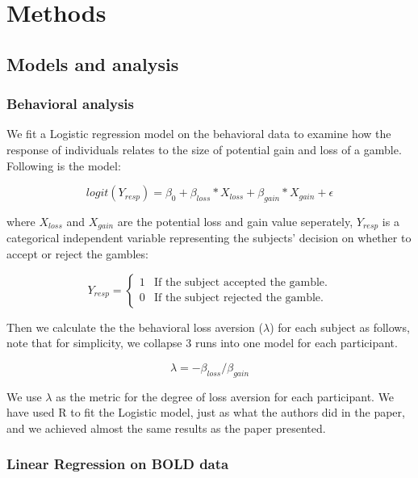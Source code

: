 \section{Methods}

\subsection{Models and analysis}

\subsubsection{Behavioral analysis}

We fit a Logistic regression model on the behavioral data to examine how the 
response of individuals relates to the size of potential gain and loss of a 
gamble. Following is the model:

\begin{equation}
logit(Y_{resp}) = \beta_0 + \beta_{loss} *X_{loss} + \beta_{gain} * X_{gain}  + 
\epsilon
\end{equation}

where $X_{loss}$ and $X_{gain}$ are the potential loss and gain value 
seperately, $Y_{resp}$ is a categorical independent variable representing 
the subjects' decision on whether to accept or reject the gambles:

\begin{displaymath}
Y_{resp} = \left \{ \begin{array}{ll}
1 & \textrm{If the subject accepted the gamble.} \\
0 & \textrm{If the subject rejected the gamble.}
\end{array} \right .
\end{displaymath}

Then we calculate the the behavioral loss aversion ($ \lambda $) for each 
subject as follows, note that for simplicity, we collapse 3 runs into one model
for each participant.

\begin{equation}
\lambda = -\beta_{loss} / \beta_{gain}
\end{equation}

We use $\lambda$ as the metric for the degree of loss aversion for each 
participant. We have used R to fit the Logistic model, just as what the 
authors did in the paper, and we achieved almost the same results as the paper 
presented.

\subsubsection{Linear Regression on BOLD data}

